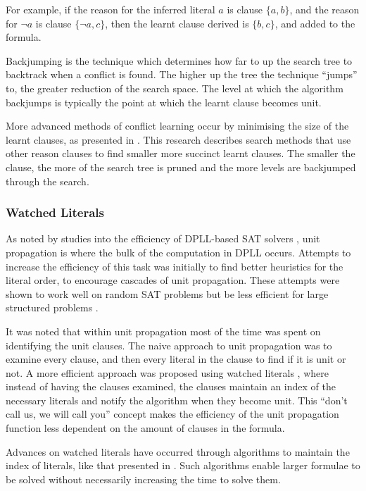 For example, if the reason for the inferred literal $a$ is clause $\{a, b\}$, and the reason for $\neg a$ is clause $\{\neg a, c\}$,
then the learnt clause derived is $\{b,c\}$, and added to the formula.

Backjumping \citep{Gaschnig1979} is the technique which determines how far to up the search tree to backtrack when a conflict is found.
The higher up the tree the technique ``jumps'' to, the greater reduction of the search space.
The level at which the algorithm backjumps is typically the point at which the learnt clause becomes unit. 

More advanced methods of conflict learning occur by minimising the size of the learnt clauses, as presented in \citep{sorensson2009}.
This research describes search methods that use other reason clauses to find smaller more succinct learnt clauses.
The smaller the clause, the more of the search tree is pruned and the more levels are backjumped through the search.

\subsubsection{Watched Literals}
As noted by studies into the efficiency of DPLL-based SAT solvers \citep{dixon2004automating}, unit propagation is where the bulk of the computation in DPLL occurs.
Attempts to increase the efficiency of this task was initially to find better heuristics \citep{JamesMCrawford1996} for the literal order, to encourage cascades of unit propagation.
These attempts were shown to work well on random SAT problems but be less efficient for large structured problems \citep{dixon2004automating}.

It was noted that within unit propagation most of the time was spent on identifying the unit clauses.
The naive approach to unit propagation was to examine every clause, and then every literal in the clause to find if it is unit or not.
A more efficient approach was proposed using watched literals \citep{Madigan2001}, where instead of having the clauses examined, 
the clauses maintain an index of the necessary literals and notify the algorithm when they become unit.
This ``don't call us, we will call you'' concept makes the efficiency of the unit propagation function less dependent on the amount of clauses in the formula.

Advances on watched literals have occurred through algorithms to maintain the index of literals, like that presented in \citep{Moskewicz2001}.
Such algorithms enable larger formulae to be solved without necessarily increasing the time to solve them.

